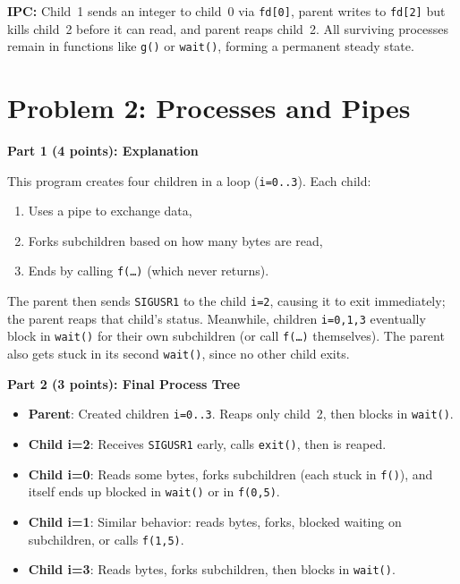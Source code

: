 \documentclass[11pt]{article}
\begin{document}
	\noindent
	\textbf{IPC:} Child~1 sends an integer to child~0 via \texttt{fd[0]}, parent writes to \texttt{fd[2]} but kills child~2 before it can read, and parent reaps child~2. 
	All surviving processes remain in functions like \texttt{g()} or \texttt{wait()}, forming a permanent steady state.
	
	\bigskip
	
	\section*{Problem 2: Processes and Pipes}
	
	\noindent
	\textbf{Part 1 (4 points): Explanation}
	
	This program creates four children in a loop (\texttt{i=0..3}). Each child:
	\begin{enumerate}
		\item Uses a pipe to exchange data,
		\item Forks subchildren based on how many bytes are read,
		\item Ends by calling \texttt{f(\dots)} (which never returns).
	\end{enumerate}
	The parent then sends \texttt{SIGUSR1} to the child \texttt{i=2}, causing it to exit immediately; the parent reaps that child’s status.  Meanwhile, children \texttt{i=0,1,3} eventually block in \texttt{wait()} for their own subchildren (or call \texttt{f(\dots)} themselves).  The parent also gets stuck in its second \texttt{wait()}, since no other child exits.
	
	\medskip
	
	\noindent
	\textbf{Part 2 (3 points): Final Process Tree}
	
	\begin{itemize}
		\item \textbf{Parent}: Created children \texttt{i=0..3}. Reaps only child~2, then blocks in \texttt{wait()}.
		\item \textbf{Child i=2}: Receives \texttt{SIGUSR1} early, calls \texttt{exit()}, then is reaped.
		\item \textbf{Child i=0}: Reads some bytes, forks subchildren (each stuck in \texttt{f()}), and itself ends up blocked in \texttt{wait()} or in \texttt{f(0,5)}.
		\item \textbf{Child i=1}: Similar behavior: reads bytes, forks, blocked waiting on subchildren, or calls \texttt{f(1,5)}.
		\item \textbf{Child i=3}: Reads bytes, forks subchildren, then blocks in \texttt{wait()}.
	\end{itemize}
	
\end{document}
